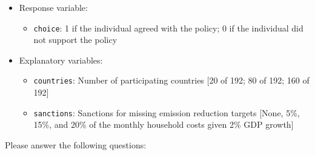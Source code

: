 \documentclass{article} %
\begin{document}
\begin{itemize}
	\item
	Response variable: 
	\begin{itemize}
		\item \texttt{choice}: 1 if the individual agreed with the policy; 0 if the individual did not support the policy
	\end{itemize}
	\item
	Explanatory variables: 
	\begin{itemize}
		\item
		\texttt{countries}: Number of participating countries [20 of 192; 80 of 192; 160 of 192]
		\item
		\texttt{sanctions}: Sanctions for missing emission reduction targets [None, 5\%, 15\%, and 20\% of the monthly household costs given 2\% GDP growth]
		
	\end{itemize}
	
\end{itemize}

\newpage
\noindent Please answer the following questions:
\end{document}
